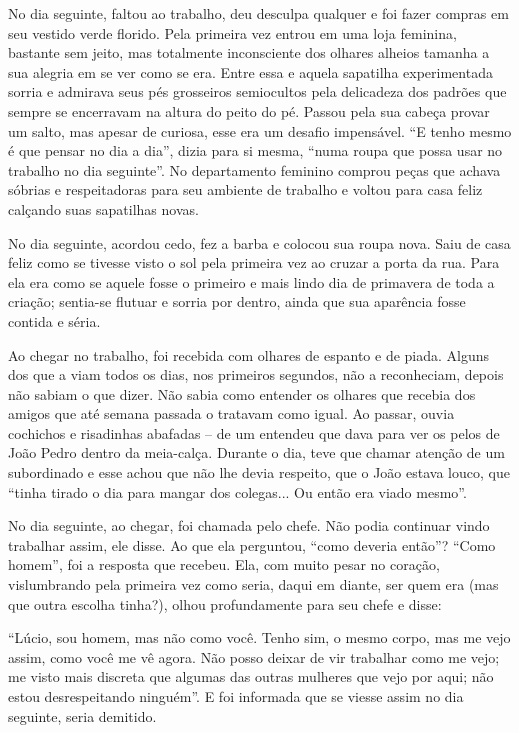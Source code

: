 \documentclass[11pt,a4paper,twoside,openany]{book}
\begin{document}
No dia seguinte, faltou ao trabalho, deu desculpa qualquer e foi fazer compras em seu vestido verde florido. Pela primeira vez entrou em uma loja feminina, bastante sem jeito, mas totalmente inconsciente dos olhares alheios tamanha a sua alegria em se ver como se era. Entre essa e aquela sapatilha experimentada sorria e admirava seus pés grosseiros semiocultos pela delicadeza dos padrões que sempre se encerravam na altura do peito do pé. Passou pela sua cabeça provar um salto, mas apesar de curiosa, esse era um desafio impensável. “E tenho mesmo é que pensar no dia a dia”, dizia para si mesma, “numa roupa que possa usar no trabalho no dia seguinte”. No departamento feminino comprou peças que achava sóbrias e respeitadoras para seu ambiente de trabalho e voltou para casa feliz calçando suas sapatilhas novas.

No dia seguinte, acordou cedo, fez a barba e colocou sua roupa nova. Saiu de casa feliz como se tivesse visto o sol pela primeira vez ao cruzar a porta da rua. Para ela era como se aquele fosse o primeiro e mais lindo dia de primavera de toda a criação; sentia-se flutuar e sorria por dentro, ainda que sua aparência fosse contida e séria.

Ao chegar no trabalho, foi recebida com olhares de espanto e de piada. Alguns dos que a viam todos os dias, nos primeiros segundos, não a reconheciam, depois não sabiam o que dizer. Não sabia como entender os olhares que recebia dos amigos que até semana passada o tratavam como igual. Ao passar, ouvia cochichos e risadinhas abafadas – de um entendeu que dava para ver os pelos de João Pedro dentro da meia-calça. Durante o dia, teve que chamar atenção de um subordinado e esse achou que não lhe devia respeito, que o João estava louco, que “tinha tirado o dia para mangar dos colegas... Ou então era viado mesmo”.

No dia seguinte, ao chegar, foi chamada pelo chefe. Não podia continuar vindo trabalhar assim, ele disse. Ao que ela perguntou, “como deveria então”? “Como homem”, foi a resposta que recebeu. Ela, com muito pesar no coração, vislumbrando pela primeira vez como seria, daqui em diante, ser quem era (mas que outra escolha tinha?), olhou profundamente para seu chefe e disse:

“Lúcio, sou homem, mas não como você. Tenho sim, o mesmo corpo, mas me vejo assim, como você me vê agora. Não posso deixar de vir trabalhar como me vejo; me visto mais discreta que algumas das outras mulheres que vejo por aqui; não estou desrespeitando ninguém”. E foi informada que se viesse assim no dia seguinte, seria demitido.
\end{document}
